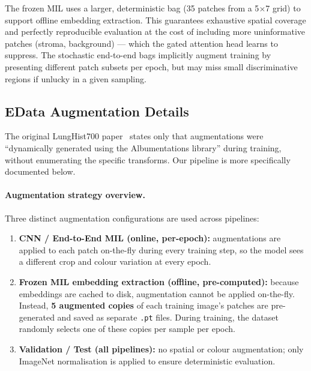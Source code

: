 \documentclass[10pt,twocolumn,letterpaper]{article}
\begin{document}
\noindent The frozen MIL uses a larger, deterministic bag (35 patches from a 5$\times$7 grid) to support offline embedding extraction. This guarantees exhaustive spatial coverage and perfectly reproducible evaluation at the cost of including more uninformative patches (stroma, background) — which the gated attention head learns to suppress. The stochastic end-to-end bags implicitly augment training by presenting different patch subsets per epoch, but may miss small discriminative regions if unlucky in a given sampling.

\subsection*{E\quad Data Augmentation Details}

\noindent The original LungHist700 paper~\cite{lunghist700paper} states only that augmentations were ``dynamically generated using the Albumentations library'' during training, without enumerating the specific transforms. Our pipeline is more specifically documented below.

\paragraph{Augmentation strategy overview.}
Three distinct augmentation configurations are used across pipelines:
\begin{enumerate}
    \item \textbf{CNN / End-to-End MIL (online, per-epoch):} augmentations are applied to each patch on-the-fly during every training step, so the model sees a different crop and colour variation at every epoch.
    \item \textbf{Frozen MIL embedding extraction (offline, pre-computed):} because embeddings are cached to disk, augmentation cannot be applied on-the-fly. Instead, \textbf{5 augmented copies} of each training image's patches are pre-generated and saved as separate \texttt{.pt} files. During training, the dataset randomly selects one of these copies per sample per epoch.
    \item \textbf{Validation / Test (all pipelines):} no spatial or colour augmentation; only ImageNet normalisation is applied to ensure deterministic evaluation.
\end{enumerate}
\end{document}
